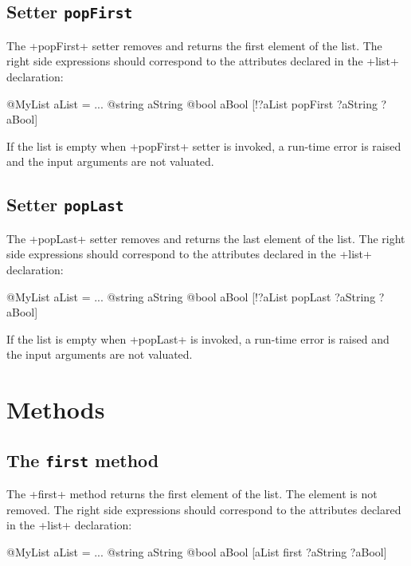 \subsection{Setter \texttt{popFirst}}


The \ggs+popFirst+ setter removes and returns the first element of the list. The right side expressions should correspond to the attributes declared in the \ggs+list+ declaration:

\begin{galgas}
@MyList aList = ...
@string aString
@bool aBool
[!?aList popFirst ?aString ?aBool]
\end{galgas}

If the list is empty when \ggs+popFirst+ setter is invoked, a run-time error is raised and the input arguments are not valuated.

\subsection{Setter \texttt{popLast}}


The \ggs+popLast+ setter removes and returns the last element of the list. The right side expressions should correspond to the attributes declared in the \ggs+list+ declaration:

\begin{galgas}
@MyList aList = ...
@string aString
@bool aBool
[!?aList popLast ?aString ?aBool]
\end{galgas}

If the list is empty when \ggs+popLast+ is invoked, a run-time error is raised and the input arguments are not valuated.

\section{Methods}

\subsection{The \texttt{first} method}

The \ggs+first+ method returns the first element of the list. The element is not removed. The right side expressions should correspond to the attributes declared in the \ggs+list+ declaration:

\begin{galgas}
@MyList aList = ...
@string aString
@bool aBool
[aList first ?aString ?aBool]
\end{galgas}

